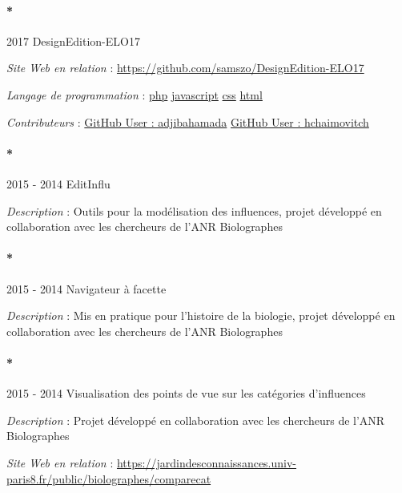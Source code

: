 \documentclass[
  a4paper,
  DIV=11,
  numbers=noendperiod]{scrreprt}
\let\oldparagraph\paragraph
\renewcommand{\paragraph}[1]{\oldparagraph{#1}\mbox{}}
\begin{document}
\paragraph*{2017 DesignEdition-ELO17}\label{sec-item301810}

\emph{Site Web en relation} :
\url{https://github.com/samszo/DesignEdition-ELO17}

\emph{Langage de programmation} :
\href{http://localhost/samszo/omk/s/fiches/item/108369}{php}
\href{http://localhost/samszo/omk/s/fiches/item/89711}{javascript}
\href{http://localhost/samszo/omk/s/fiches/item/102418}{css}
\href{http://localhost/samszo/omk/s/fiches/item/96621}{html}

\emph{Contributeurs} :
\href{http://localhost/samszo/omk/s/fiches/item/300865}{GitHub User :
adjibahamada}
\href{http://localhost/samszo/omk/s/fiches/item/300867}{GitHub User :
hchaimovitch}

\paragraph*{2015 - 2014 EditInflu}\label{sec-item299736}

\emph{Description} : Outils pour la modélisation des influences, projet
développé en collaboration avec les chercheurs de l'ANR Biolographes

\paragraph*{2015 - 2014 Navigateur à facette}\label{sec-item299737}

\emph{Description} : Mis en pratique pour l'histoire de la biologie,
projet développé en collaboration avec les chercheurs de l'ANR
Biolographes

\paragraph*{2015 - 2014 Visualisation des points de vue sur les
catégories d'influences}\label{sec-item299738}

\emph{Description} : Projet développé en collaboration avec les
chercheurs de l'ANR Biolographes

\emph{Site Web en relation} :
\url{https://jardindesconnaissances.univ-paris8.fr/public/biolographes/comparecat}
\end{document}
